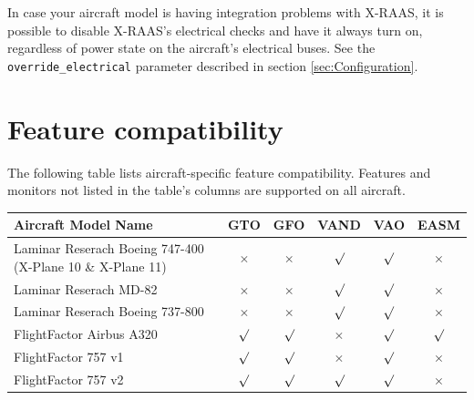 \documentclass[a4paper,12pt]{article}
\newcommand{\confopt}[1]{\texttt{#1}}
\begin{document}
In case your aircraft model is having integration problems with X-RAAS,
it is possible to disable X-RAAS's electrical checks and have it always
turn on, regardless of power state on the aircraft's electrical buses.
See the \confopt{override\_electrical} parameter described in section
\ref{sec:Configuration}.

\newpage
\section{Feature compatibility}
\label{sec:Compatibility}

The following table lists aircraft-specific feature compatibility.
Features and monitors not listed in the table's columns are supported on
all aircraft.

\begin{center}
\begin{tabular}{|p{7cm}|c|c|c|c|c|}

\hline

\rowcolor{tablehdrcolor}
\textbf{Aircraft Model Name} & \textbf{GTO} & \textbf{GFO} & \textbf{VAND} &
\textbf{VAO} & \textbf{EASM} \\

\hline

Laminar Reserach Boeing 747-400\newline
(X-Plane 10 \& X-Plane 11) & $\times$ & $\times$ & $\surd$ & $\surd$ &
$\times$ \\

\hline

Laminar Reserach MD-82 & $\times$ & $\times$ & $\surd$ & $\surd$ & $\times$ \\

\hline

Laminar Reserach Boeing 737-800 & $\times$ & $\times$ & $\surd$ & $\surd$ &
$\times$ \\

\hline

FlightFactor Airbus A320 & $\surd$ & $\surd$ & $\times$ & $\surd$ &
$\surd$ \\

\hline

FlightFactor 757 v1 & $\surd$ & $\surd$ & $\times$ & $\surd$ &
$\times$ \\

\hline

FlightFactor 757 v2 & $\surd$ & $\surd$ & $\surd$ & $\surd$ &
$\times$ \\

\hline


\end{tabular}
\end{center}
\end{document}
